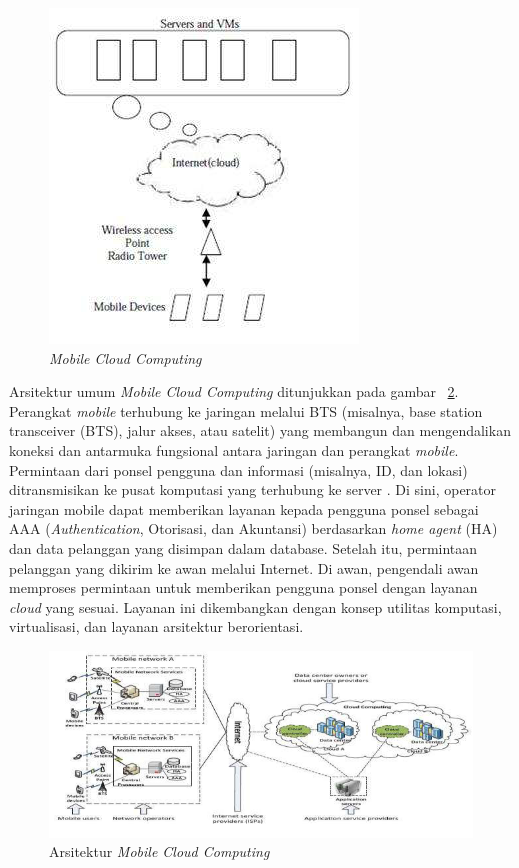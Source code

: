 \begin{figure}[h]
	\centering
		\includegraphics{Gambar/mms_prinsip}
	\caption{\textit{Mobile Cloud Computing}}
	\label{fig:MobileCloudComputing}
\end{figure}
	
\hspace{0,5cm} Arsitektur umum \textit{Mobile Cloud Computing} ditunjukkan pada gambar ~\ref{fig:Arsitekture MobileCloudComputing}\cite{mcc}. Perangkat \textit{mobile} terhubung ke jaringan melalui BTS (misalnya, base station transceiver (BTS), jalur akses, atau satelit) yang membangun dan mengendalikan koneksi dan antarmuka fungsional antara jaringan dan perangkat \textit{mobile}. Permintaan dari ponsel pengguna dan informasi (misalnya, ID, dan lokasi) ditransmisikan ke pusat komputasi yang terhubung ke server . Di sini, operator jaringan mobile dapat memberikan layanan kepada pengguna ponsel sebagai AAA (\textit{Authentication}, Otorisasi, dan Akuntansi) berdasarkan \textit{home agent} (HA) dan data pelanggan yang disimpan dalam database. Setelah itu,
permintaan pelanggan yang dikirim ke awan melalui Internet. Di awan, pengendali awan memproses permintaan untuk memberikan pengguna ponsel dengan layanan \textit{cloud} yang sesuai. Layanan ini dikembangkan dengan konsep utilitas komputasi, virtualisasi, dan layanan arsitektur berorientasi.
	
\begin{figure}[h]
	\centering
		\includegraphics[scale=0.7]{Gambar/mcc_arsitektur}
	\caption{Arsitektur \textit{Mobile Cloud Computing}}
	\label{fig:Arsitekture MobileCloudComputing}
\end{figure}


